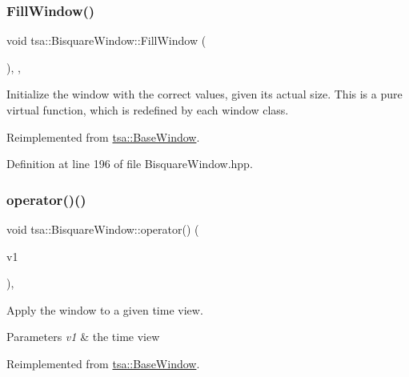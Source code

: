 \subsubsection{\texorpdfstring{Fill\+Window()}{FillWindow()}}
{\footnotesize\ttfamily void tsa\+::\+Bisquare\+Window\+::\+Fill\+Window (\begin{DoxyParamCaption}{ }\end{DoxyParamCaption})\hspace{0.3cm}{\ttfamily [inline]}, {\ttfamily [private]}, {\ttfamily [virtual]}}

Initialize the window with the correct values, given its actual size. This is a pure virtual function, which is redefined by each window class. 

Reimplemented from \hyperlink{classtsa_1_1_base_window_aa74b29105d94caa521d308198e8e6643}{tsa\+::\+Base\+Window}.



Definition at line 196 of file Bisquare\+Window.\+hpp.

\mbox{\label{classtsa_1_1_bisquare_window_a8ad862435b17d306997adbb8be9c9b4f}} 
\subsubsection{\texorpdfstring{operator()()}{operator()()}\hspace{0.1cm}{\footnotesize\ttfamily [1/2]}}
{\footnotesize\ttfamily void tsa\+::\+Bisquare\+Window\+::operator() (\begin{DoxyParamCaption}\item[{\hyperlink{namespacetsa_ac599574bcc094eda25613724b8f3ca9e}{Seq\+View\+Double} \&}]{v1 }\end{DoxyParamCaption})\hspace{0.3cm}{\ttfamily [inline]}, {\ttfamily [virtual]}}

Apply the window to a given time view.


\begin{DoxyParams}{Parameters}
{\em v1} & the time view \\
\hline
\end{DoxyParams}


Reimplemented from \hyperlink{classtsa_1_1_base_window_a05d9edb95dc01840a1b2df78dfa3a8c1}{tsa\+::\+Base\+Window}.



